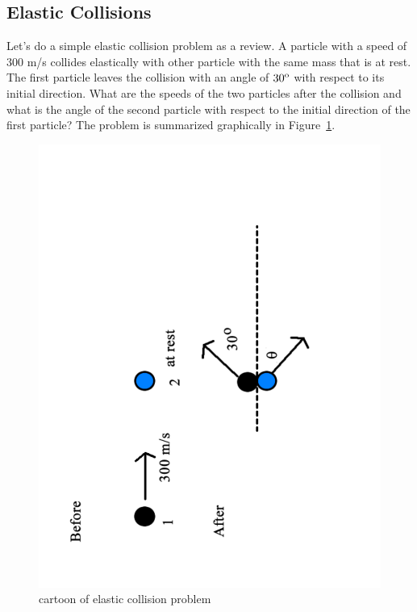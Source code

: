 \subsection{Elastic Collisions}

Let's do a simple elastic collision problem as a review.  A particle with a speed of 300 m/s collides elastically with other particle with the same mass that is at rest.  The first particle leaves the collision with an angle of ${\rm 30^o}$ with respect to its initial direction.  What are the speeds of the two particles after the collision and what is the angle of the second particle with respect to the initial direction of the first particle?  The problem is summarized graphically in Figure~\ref{fig:elastic}.

 
\begin{figure}[h]
\centering\includegraphics[scale=0.5]{./collisions/Pictures/elastic.pdf}
\caption{cartoon of elastic collision problem}
\label{fig:elastic}
\end{figure}


